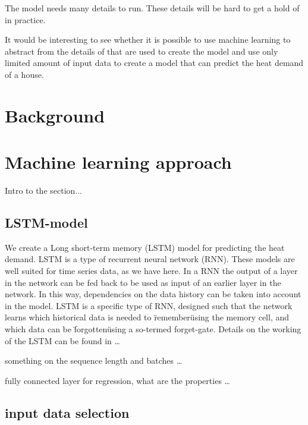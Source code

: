 The model needs many details to run. These details will be hard to get a hold of in practice.

It would be interesting to see whether it is possible to use machine learning to abstract from the details of that are used to create the model and use only limited amount of input data to create a model that can predict the heat demand of a house. 

 


\section{Background}\label{s:background}


\section{Machine learning approach}\label{s:MLA}
Intro to the section...

\subsection{LSTM-model}
We create a Long short-term memory (LSTM) model for predicting the heat demand. LSTM is a type of recurrent neural network (RNN). These models are well suited for time series data, as we have here. In a RNN the output of a layer in the network can be fed back to be used as input of an earlier layer in the network. In this way, dependencies on the data history can be taken into account in the model. LSTM is a specific type of RNN, designed such that the network learns which historical data is needed to \"remember\" using the memory cell, and which data can be \"forgotten\" using a so-termed forget-gate. Details on the working of the LSTM can be found in \ldots 

something on the sequence length and batches \ldots

fully connected layer for regression, what are the properties \ldots  


\subsection{input data selection}

